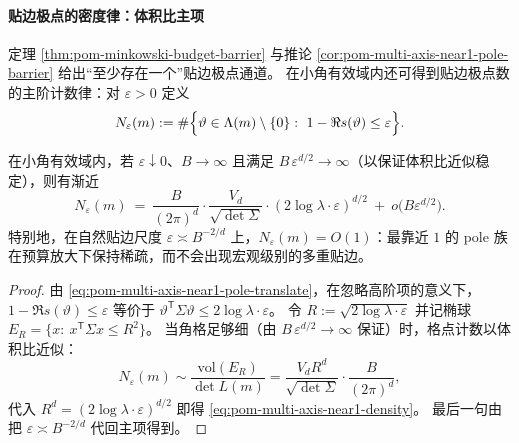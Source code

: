 \paragraph{贴边极点的密度律：体积比主项}
定理 \ref{thm:pom-minkowski-budget-barrier} 与推论 \ref{cor:pom-multi-axis-near1-pole-barrier} 给出“至少存在一个”贴边极点通道。
在小角有效域内还可得到贴边极点数的主阶计数律：对 \(\varepsilon>0\) 定义
\[
N_\varepsilon(m):=\#\Bigl\{\vartheta\in \Lambda(m)\setminus\{0\}:\ 1-\Re s(\vartheta)\le \varepsilon\Bigr\}.
\]

\begin{proposition}[贴边极点计数主项]\label{prop:pom-multi-axis-near1-density}
在小角有效域内，若 \(\varepsilon\downarrow 0\)、\(B\to\infty\) 且满足 \(B\,\varepsilon^{d/2}\to\infty\)（以保证体积比近似稳定），则有渐近
\begin{equation}\label{eq:pom-multi-axis-near1-density}
N_{\varepsilon}(m)
\ =\
\frac{B}{(2\pi)^{d}}\cdot\frac{V_{d}}{\sqrt{\det\Sigma}}\cdot(2\log\lambda\cdot\varepsilon)^{d/2}
\ +\ o\!\bigl(B\varepsilon^{d/2}\bigr).
\end{equation}
特别地，在自然贴边尺度 \(\varepsilon\asymp B^{-2/d}\) 上，\(N_\varepsilon(m)=O(1)\)：最靠近 \(1\) 的 pole 族在预算放大下保持稀疏，而不会出现宏观级别的多重贴边。
\end{proposition}

\begin{proof}
由 \eqref{eq:pom-multi-axis-near1-pole-translate}，在忽略高阶项的意义下，
\(
1-\Re s(\vartheta)\le \varepsilon
\)
等价于
\(
\vartheta^{\mathsf T}\Sigma\vartheta\le 2\log\lambda\cdot\varepsilon
\)。
令 \(R:=\sqrt{2\log\lambda\cdot\varepsilon}\) 并记椭球 \(E_R=\{x:\ x^{\mathsf T}\Sigma x\le R^2\}\)。
当角格足够细（由 \(B\,\varepsilon^{d/2}\to\infty\) 保证）时，格点计数以体积比近似：
\[
N_\varepsilon(m)
\sim
\frac{\mathrm{vol}(E_R)}{\det L(m)}
=\frac{V_d R^d}{\sqrt{\det\Sigma}}\cdot\frac{B}{(2\pi)^d},
\]
代入 \(R^d=(2\log\lambda\cdot\varepsilon)^{d/2}\) 即得 \eqref{eq:pom-multi-axis-near1-density}。
最后一句由把 \(\varepsilon\asymp B^{-2/d}\) 代回主项得到。
\end{proof}

